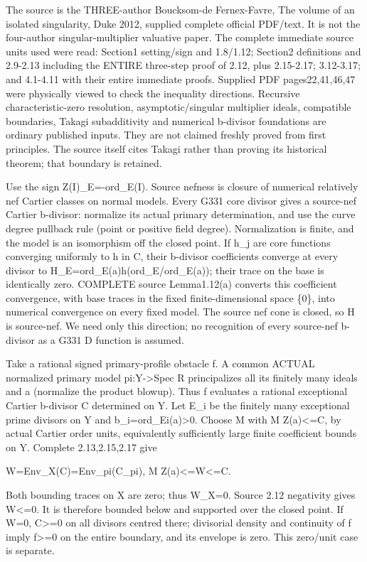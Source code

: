 \documentclass[11pt]{article}
\begin{document}
The source is the THREE-author Boucksom-de Fernex-Favre, The volume of an isolated singularity, Duke 2012, supplied complete official PDF/text. It is not the four-author singular-multiplier valuative paper. The complete immediate source units used were read: Section1 setting/sign and 1.8/1.12; Section2 definitions and 2.9-2.13 including the ENTIRE three-step proof of 2.12, plus 2.15-2.17; 3.12-3.17; and 4.1-4.11 with their entire immediate proofs. Supplied PDF pages22,41,46,47 were physically viewed to check the inequality directions. Recursive characteristic-zero resolution, asymptotic/singular multiplier ideals, compatible boundaries, Takagi subadditivity and numerical b-divisor foundations are ordinary published inputs. They are not claimed freshly proved from first principles. The source itself cites Takagi rather than proving its historical theorem; that boundary is retained.

Use the sign Z(I)\_E=-ord\_E(I). Source nefness is closure of numerical relatively nef Cartier classes on normal models. Every G331 core divisor gives a source-nef Cartier b-divisor: normalize its actual primary determination, and use the curve degree pullback rule (point or positive field degree). Normalization is finite, and the model is an isomorphism off the closed point. If h\_j are core functions converging uniformly to h in C, their b-divisor coefficients converge at every divisor to H\_E=ord\_E(a)h(ord\_E/ord\_E(a)); their trace on the base is identically zero. COMPLETE source Lemma1.12(a) converts this coefficient convergence, with base traces in the fixed finite-dimensional space \{0\}, into numerical convergence on every fixed model. The source nef cone is closed, so H is source-nef. We need only this direction; no recognition of every source-nef b-divisor as a G331 D function is assumed.

Take a rational signed primary-profile obstacle f. A common ACTUAL normalized primary model pi:Y->Spec R principalizes all its finitely many ideals and a (normalize the product blowup). Thus f evaluates a rational exceptional Cartier b-divisor C determined on Y. Let E\_i be the finitely many exceptional prime divisors on Y and b\_i=ord\_Ei(a)>0. Choose M with M Z(a)<=C, by actual Cartier order units, equivalently sufficiently large finite coefficient bounds on Y. Complete 2.13,2.15,2.17 give

    W=Env\_X(C)=Env\_pi(C\_pi),   M Z(a)<=W<=C.

Both bounding traces on X are zero; thus W\_X=0. Source 2.12 negativity gives W<=0. It is therefore bounded below and supported over the closed point. If W=0, C>=0 on all divisors centred there; divisorial density and continuity of f imply f>=0 on the entire boundary, and its envelope is zero. This zero/unit case is separate.
\end{document}

